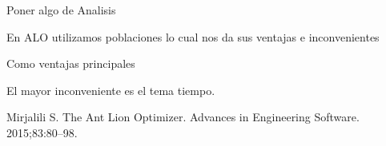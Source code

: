      Poner algo de Analisis
    
     En ALO utilizamos poblaciones lo cual nos da sus ventajas e inconvenientes

     Como ventajas principales

     El mayor inconveniente es el tema tiempo.



   \begin{thebibliography}{9}
    Mirjalili S. The Ant Lion Optimizer. Advances in Engineering Software. 2015;83:80–98.
    
    \end{thebibliography}



